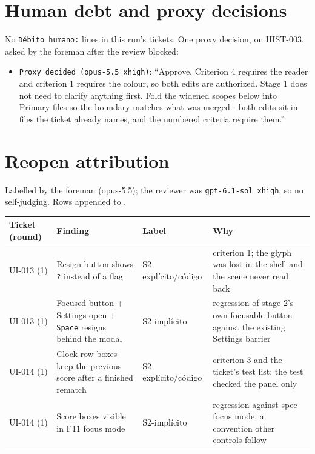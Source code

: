 \documentclass[11pt,a4paper]{article}
\begin{document}
\section*{Human debt and proxy decisions}

No \texttt{Débito humano:} lines in this run's tickets. One proxy decision, on HIST-003,
asked by the foreman after the review blocked:

\begin{itemize}
  \item \texttt{Proxy decided (opus-5.5 xhigh)}: ``Approve. Criterion 4 requires the reader and
        criterion 1 requires the colour, so both edits are authorized. Stage 1 does not need to
        clarify anything first. Fold the widened scopes below into Primary files so the
        boundary matches what was merged - both edits sit in files the ticket already names,
        and the numbered criteria require them.''
\end{itemize}

\section*{Reopen attribution}

Labelled by the foreman (opus-5.5); the reviewer was \texttt{gpt-6.1-sol xhigh}, so no
self-judging. Rows appended to .

{\small\noindent
\begin{tabularx}{\linewidth}{@{}>{\raggedright\arraybackslash}p{1.6cm}X>{\raggedright\arraybackslash}p{2.7cm}X@{}}
\toprule
Ticket (round) & Finding & Label & Why \\
\midrule
UI-013 (1) & Resign button shows \texttt{?} instead of a flag & S2-explícito/\allowbreak código & criterion 1; the glyph was lost in the shell and the scene never read back \\
UI-013 (1) & Focused button + Settings open + \texttt{Space} resigns behind the modal & S2-implícito & regression of stage 2's own focusable button against the existing Settings barrier \\
UI-014 (1) & Clock-row boxes keep the previous score after a finished rematch & S2-explícito/\allowbreak código & criterion 3 and the ticket's test list; the test checked the panel only \\
UI-014 (1) & Score boxes visible in F11 focus mode & S2-implícito & regression against spec focus mode, a convention other controls follow \\
\bottomrule
\end{tabularx}
}
\end{document}
